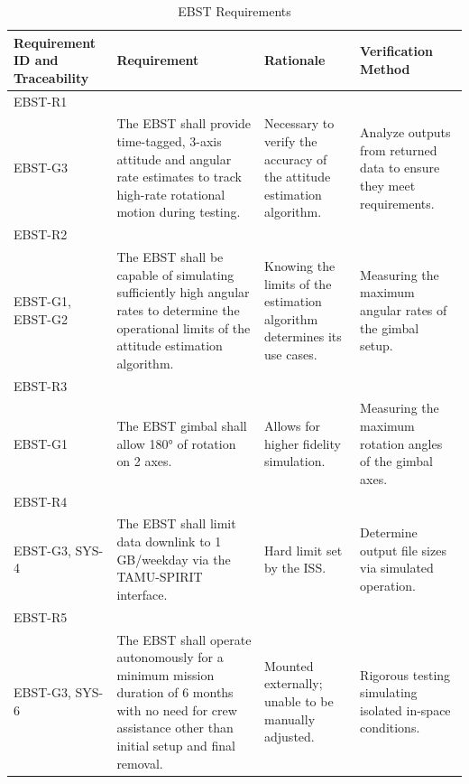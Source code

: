 \documentclass[conf]{new-aiaa}
\begin{document}
\begin{table}[H]
    \centering
    \footnotesize
    \setlength{\tabcolsep}{4pt}
    \renewcommand{\arraystretch}{1.15}
    \begin{tabularx}{\textwidth}{@{}>{\raggedright\arraybackslash}m{2.4cm}YYY@{}}
    \toprule
    \textbf{Requirement ID and Traceability} & \textbf{Requirement} & \textbf{Rationale} & \textbf{Verification Method} \\
    \midrule
    EBST-R1\\EBST-G3 &
    The EBST shall provide time-tagged, 3-axis attitude and angular rate estimates to track high-rate rotational motion during testing. &
    Necessary to verify the accuracy of the attitude estimation algorithm. &
    Analyze outputs from returned data to ensure they meet requirements. \\ \hline

    EBST-R2\\EBST-G1, EBST-G2 &
    The EBST shall be capable of simulating sufficiently high angular rates to determine the operational limits of the attitude estimation algorithm. &
    Knowing the limits of the estimation algorithm determines its use cases. &
    Measuring the maximum angular rates of the gimbal setup. \\ \hline

    EBST-R3\\EBST-G1 &
    The EBST gimbal shall allow 180° of rotation on 2 axes. &
    Allows for higher fidelity simulation. &
    Measuring the maximum rotation angles of the gimbal axes. \\ \hline

    EBST-R4\\EBST-G3, SYS-4 &
    The EBST shall limit data downlink to 1 GB/weekday via the TAMU-SPIRIT interface. &
    Hard limit set by the ISS. &
    Determine output file sizes via simulated operation. \\ \hline

    EBST-R5\\EBST-G3, SYS-6 &
    The EBST shall operate autonomously for a minimum mission duration of 6 months with no need for crew assistance other than initial setup and final removal. &
    Mounted externally; unable to be manually adjusted. &
    Rigorous testing simulating isolated in-space conditions. \\
    \bottomrule
    \end{tabularx}
    \caption{EBST Requirements}
    \label{tab:ebst_requirements}
\end{table}
\end{document}
